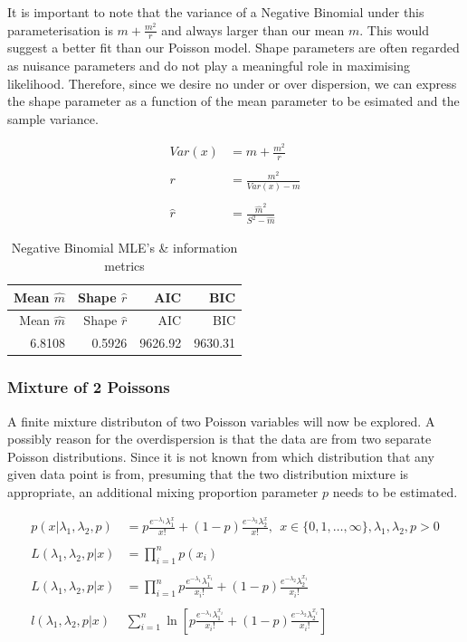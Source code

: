 \documentclass[11pt,preprint, authoryear]{elsarticle}
\numberwithin{equation}{section}
\numberwithin{figure}{section}
\numberwithin{table}{section}
\begin{document}
It is important to note that the variance of a Negative Binomial under
this parameterisation is \(m + \frac{m^2}{r}\) and always larger than
our mean \(m\). This would suggest a better fit than our Poisson model.
Shape parameters are often regarded as nuisance parameters and do not
play a meaningful role in maximising likelihood. Therefore, since we
desire no under or over dispersion, we can express the shape parameter
as a function of the mean parameter to be esimated and the sample
variance.

\begin{align*}
Var(x) &= m + \frac{m^2}{r} \\
\\
r &= \frac{m^2}{Var(x) - m} \\
\\
\hat{r} &= \frac{\hat{m}^2}{S^2 - \hat{m}}
\end{align*}

\begin{longtable}[]{@{}rrrr@{}}
\caption{Negative Binomial MLE's \& information metrics}\tabularnewline
\toprule
Mean \(\hat{m}\) & Shape \(\hat{r}\) & AIC & BIC\tabularnewline
\midrule
\endfirsthead
\toprule
Mean \(\hat{m}\) & Shape \(\hat{r}\) & AIC & BIC\tabularnewline
\midrule
\endhead
6.8108 & 0.5926 & 9626.92 & 9630.31\tabularnewline
\bottomrule
\end{longtable}

\subsubsection{Mixture of 2 Poissons}\label{mixture-of-2-poissons}

A finite mixture distributon of two Poisson variables will now be
explored. A possibly reason for the overdispersion is that the data are
from two separate Poisson distributions. Since it is not known from
which distribution that any given data point is from, presuming that the
two distribution mixture is appropriate, an additional mixing proportion
parameter \(p\) needs to be estimated.

\begin{align*} 
p(x|\lambda_1,\lambda_2,p) & =  p\frac{e^{-\lambda_1} \lambda_1^x}{x!} + (1-p)\frac{e^{-\lambda_2} \lambda_2^x}{x!},\ \ x\in \{0,1,\ldots,\infty\},\lambda_1 , \lambda_2 , p >0 \\
\\
L(\lambda_1,\lambda_2,p|x) & = \prod_{i=1}^n p(x_i) \\
\\
L(\lambda_1,\lambda_2,p|x) & =  \prod_{i=1}^n p\frac{e^{-\lambda_1} \lambda_1^{x_i}}{x_i!} + (1-p)\frac{e^{-\lambda_2} \lambda_2^{x_i}}{x_i!} \\
\\
l(\lambda_1,\lambda_2,p|x) & \sum^n_{i=1} \ln [ p\frac{e^{-\lambda_1} \lambda_1^{x_i}}{x_i!} + (1-p)\frac{e^{-\lambda_2} \lambda_2^{x_i}}{x_i!} ]
\end{align*}
\end{document}
